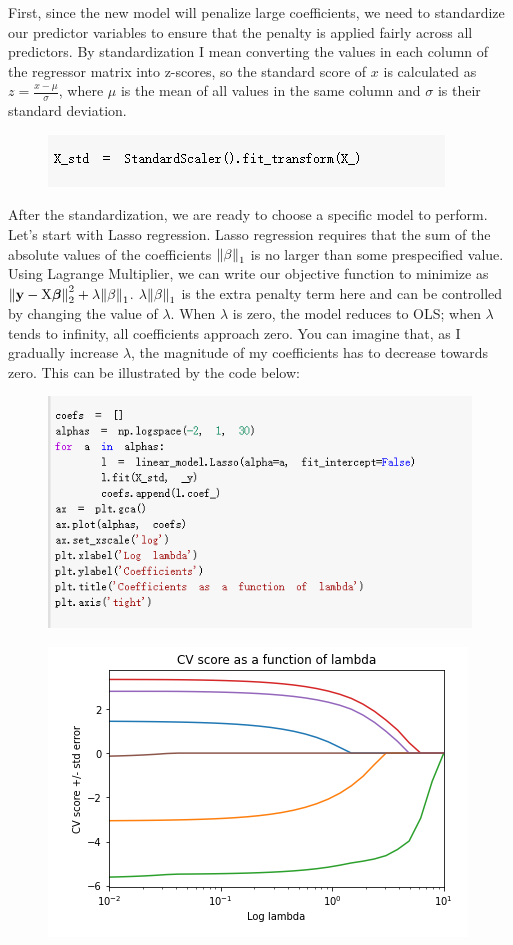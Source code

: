 \documentclass{article}
\begin{document}
First, since the new model will penalize large coefficients, we need to standardize our predictor variables to ensure that the penalty is applied fairly across all predictors. By standardization I mean converting the values in each column of the regressor matrix into z-scores, so the standard score of $x$ is calculated as $z = \frac{x - \mu}{\sigma}$, where $\mu$ is the mean of all values in the same column and $\sigma$ is their standard deviation.
\begin{figure}[H]\includegraphics[width=0.6\linewidth]{33}\end{figure}
After the standardization, we are ready to choose a specific model to perform. Let's start with Lasso regression. Lasso regression requires that the sum of the absolute values of the coefficients $\norm{\beta}_1$ is no larger than some prespecified value. Using Lagrange Multiplier, we can write our objective function to minimize as $\norm{\mathbf{y} - \text{X} \bm{\beta}}^2_2 + \lambda \norm{\beta}_1$. $\lambda \norm{\beta}_1$ is the extra penalty term here and can be controlled by changing the value of $\lambda$. When $\lambda$ is zero, the model reduces to OLS; when $\lambda$ tends to infinity, all coefficients approach zero. You can imagine that, as I gradually increase $\lambda$, the magnitude of my coefficients has to decrease towards zero. This can be illustrated by the code below:
\begin{figure}[H]\includegraphics[width=0.8\linewidth]{34}\end{figure}
\begin{figure}[H]\centering\includegraphics[width=0.5\linewidth]{35}\end{figure}
\end{document}
